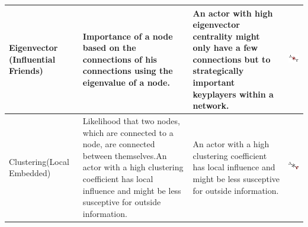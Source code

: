 \documentclass[a4paper,landscape,12pt]{scrreprt}
\begin{document}
\begin{tabular}{|p{7cm}|p{7cm}|p{7cm}|p{4cm}|}
Eigenvector (Influential Friends) & Importance of a node
based on the connections
of his connections using
the eigenvalue of a node.&
An actor with high
eigenvector centrality
might only have a few
connections but to
strategically important
keyplayers within a
network.& \vspace{0cm} \includegraphics[scale=0.4]{./img/egeg.png}\\ \hline
Clustering(Local Embedded) & Likelihood that two nodes,
which are connected to a
node, are connected
between themselves.An actor with a high
clustering coefficient has
local influence and might
be less susceptive for
outside information.& An actor with a high
clustering coefficient has
local influence and might
be less susceptive for
outside information.
& \vspace{0cm} \includegraphics[scale=0.2]{./img/clusteg.png}\\
\hline
\end{tabular}
\end{document}
